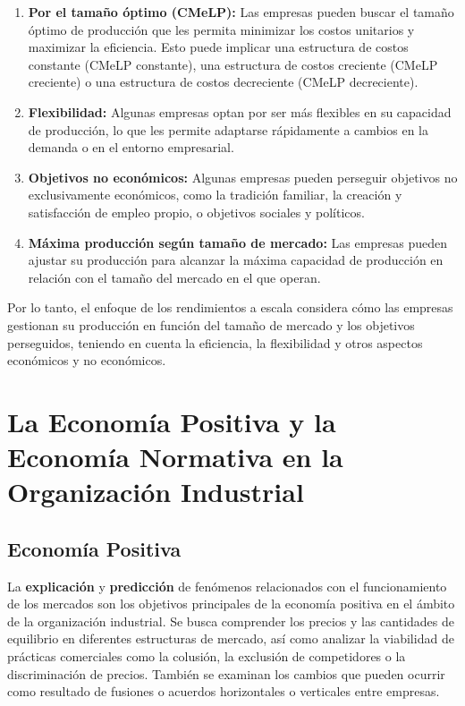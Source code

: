 \documentclass[
  a4paper,
]{article}
\begin{document}
\begin{enumerate}
\def\labelenumi{\Alph{enumi})}
\item
  \textbf{Por el tamaño óptimo (CMeLP):} Las empresas pueden buscar el
  tamaño óptimo de producción que les permita minimizar los costos
  unitarios y maximizar la eficiencia. Esto puede implicar una
  estructura de costos constante (CMeLP constante), una estructura de
  costos creciente (CMeLP creciente) o una estructura de costos
  decreciente (CMeLP decreciente).
\item
  \textbf{Flexibilidad:} Algunas empresas optan por ser más flexibles en
  su capacidad de producción, lo que les permite adaptarse rápidamente a
  cambios en la demanda o en el entorno empresarial.
\item
  \textbf{Objetivos no económicos:} Algunas empresas pueden perseguir
  objetivos no exclusivamente económicos, como la tradición familiar, la
  creación y satisfacción de empleo propio, o objetivos sociales y
  políticos.
\item
  \textbf{Máxima producción según tamaño de mercado:} Las empresas
  pueden ajustar su producción para alcanzar la máxima capacidad de
  producción en relación con el tamaño del mercado en el que operan.
\end{enumerate}

Por lo tanto, el enfoque de los rendimientos a escala considera cómo las
empresas gestionan su producción en función del tamaño de mercado y los
objetivos perseguidos, teniendo en cuenta la eficiencia, la flexibilidad
y otros aspectos económicos y no económicos.

\hypertarget{la-economuxeda-positiva-y-la-economuxeda-normativa-en-la-organizaciuxf3n-industrial}{%
\section{La Economía Positiva y la Economía Normativa en la Organización
Industrial}\label{la-economuxeda-positiva-y-la-economuxeda-normativa-en-la-organizaciuxf3n-industrial}}

\hypertarget{economuxeda-positiva}{%
\subsection{Economía Positiva}\label{economuxeda-positiva}}

La \textbf{explicación} y \textbf{predicción} de fenómenos relacionados
con el funcionamiento de los mercados son los objetivos principales de
la economía positiva en el ámbito de la organización industrial. Se
busca comprender los precios y las cantidades de equilibrio en
diferentes estructuras de mercado, así como analizar la viabilidad de
prácticas comerciales como la colusión, la exclusión de competidores o
la discriminación de precios. También se examinan los cambios que pueden
ocurrir como resultado de fusiones o acuerdos horizontales o verticales
entre empresas.
\end{document}
